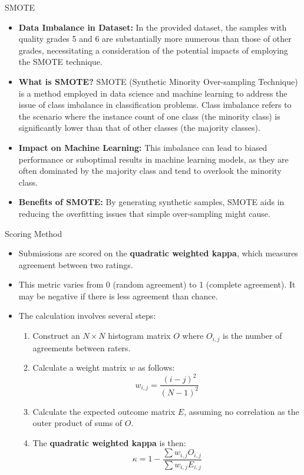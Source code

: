 \documentclass[
 size=14pt,
 paper=smartboard,  %
 mode=present, 		%
 display=slides, 	%
 style=tuliplab,  	%
 pauseslide,
 fleqn,leqno]{powerdot}
\begin{document}
\begin{slide}{SMOTE}
	
	\begin{itemize}
		\item \textbf{Data Imbalance in Dataset:} In the provided dataset, the samples with quality grades 5 and 6 are substantially more numerous than those of other grades, necessitating a consideration of the potential impacts of employing the SMOTE technique.
		
		\item \textbf{What is SMOTE?} SMOTE (Synthetic Minority Over-sampling Technique) is a method employed in data science and machine learning to address the issue of class imbalance in classification problems. Class imbalance refers to the scenario where the instance count of one class (the minority class) is significantly lower than that of other classes (the majority classes). 
		
		\item \textbf{Impact on Machine Learning:} This imbalance can lead to biased performance or suboptimal results in machine learning models, as they are often dominated by the majority class and tend to overlook the minority class.
		
		\item \textbf{Benefits of SMOTE:} By generating synthetic samples, SMOTE aids in reducing the overfitting issues that simple over-sampling might cause.
	\end{itemize}
	
\end{slide}
\begin{slide}{Scoring Method}
	\begin{itemize}
		\small 
		\item Submissions are scored on the \textbf{quadratic weighted kappa}, which measures agreement between two ratings.
		\item This metric varies from 0 (random agreement) to 1 (complete agreement). It may be negative if there is less agreement than chance.
		\item The calculation involves several steps:
		\begin{enumerate}
			\item Construct an \( N \times N \) histogram matrix \( O \) where \( O_{i,j} \) is the number of agreements between raters.
			\item Calculate a weight matrix \( w \) as follows:
			\[
			w_{i,j} = \frac{(i - j)^2}{(N - 1)^2}
			\]
			\item Calculate the expected outcome matrix \( E \), assuming no correlation as the outer product of sums of \( O \).
			\item The \textbf{quadratic weighted kappa} is then:
			\[
			\kappa = 1 - \frac{\sum w_{i,j} O_{i,j}}{\sum w_{i,j} E_{i,j}}
			\]
		\end{enumerate}
	\end{itemize}
\end{slide}
\end{document}
